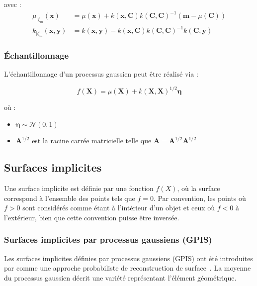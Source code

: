 avec :
\begin{align}
\mu_{|\zeta_m}(\mathbf{x}) &= \mu(\mathbf{x}) + k(\mathbf{x}, \mathbf{C}) k(\mathbf{C}, \mathbf{C})^{-1} (\mathbf{m} - \mu(\mathbf{C})) \\
 k_{|\zeta_m}(\mathbf{x}, \mathbf{y}) &= k(\mathbf{x}, \mathbf{y}) - k(\mathbf{x}, \mathbf{C}) k(\mathbf{C}, \mathbf{C})^{-1} k(\mathbf{C}, \mathbf{y})
\end{align}

\subsubsection{Échantillonnage}

L'échantillonnage d'un processus gaussien peut être réalisé via :

\begin{equation}
f(\mathbf{X}) = \mu(\mathbf{X}) + k(\mathbf{X}, \mathbf{X})^{1/2} \boldsymbol{\eta}
\end{equation}

où :
\begin{itemize}[noitemsep]
    \item $\boldsymbol{\eta} \sim \mathcal{N}(0,1)$
    \item $\mathbf{A}^{1/2}$ est la racine carrée matricielle telle que $\mathbf{A} = \mathbf{A}^{1/2}\mathbf{A}^{1/2}$
\end{itemize}

\subsection{Surfaces implicites}

Une surface implicite est définie par une fonction $f(X)$, où la surface correspond à l'ensemble des points tels que $f = 0$. Par convention, les points où $f > 0$ sont considérés comme étant à l'intérieur d'un objet et ceux où $f < 0$ à l'extérieur, bien que cette convention puisse être inversée.

\subsubsection{Surfaces implicites par processus gaussiens (GPIS)}

Les surfaces implicites définies par processus gaussiens (GPIS) ont été introduites par \textcite{williams2007gaussian} comme une approche probabiliste de reconstruction de surface~\cite{martens2016gpis}. La moyenne du processus gaussien décrit une variété représentant l'élément géométrique.

